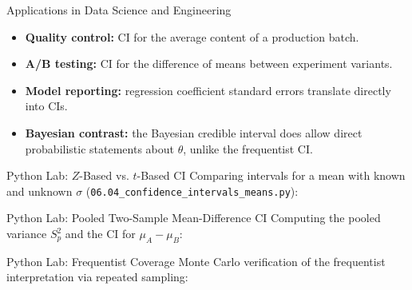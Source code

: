 \documentclass[aspectratio=169,xcolor={dvipsnames,table}]{beamer}
\begin{document}
\begin{frame}{Applications in Data Science and Engineering}
	\vspace{-0.1cm}
	\begin{itemize}\itemsep=0.1cm
		\item \textbf{Quality control:} CI for the average content of a production batch. \pause
		\item \textbf{A/B testing:} CI for the difference of means between experiment variants. \pause
		\item \textbf{Model reporting:} regression coefficient standard errors translate directly into CIs. \pause
		\item \textbf{Bayesian contrast:} the Bayesian credible interval does allow direct probabilistic statements about $\theta$, unlike the frequentist CI.
	\end{itemize}
\end{frame}

\begin{frame}[fragile]{Python Lab: $Z$-Based vs. $t$-Based CI}
	\vspace{-0.05cm}
	\scriptsize
	Comparing intervals for a mean with known and unknown $\sigma$ (\texttt{06.04\_confidence\_intervals\_means.py}):
	{
	}
\end{frame}

\begin{frame}[fragile]{Python Lab: Pooled Two-Sample Mean-Difference CI}
	\vspace{-0.05cm}
	\scriptsize
	Computing the pooled variance $S_p^2$ and the CI for $\mu_A-\mu_B$:
	{
	}
\end{frame}

\begin{frame}[fragile]{Python Lab: Frequentist Coverage}
	\vspace{-0.05cm}
	\scriptsize
	Monte Carlo verification of the frequentist interpretation via repeated sampling:
	{
	}
\end{frame}
\end{document}
